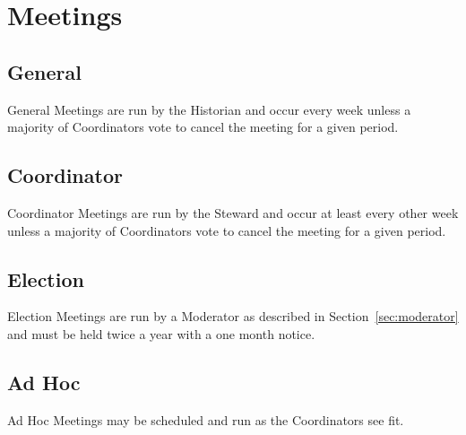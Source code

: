\chapter{Meetings}

\section{General}\label{sec:general_meetings}
General Meetings are run by the Historian and occur every week unless a majority of Coordinators vote to cancel the meeting for a given period.

\section{Coordinator}\label{sec:coordinator_meetings}
Coordinator Meetings are run by the Steward and occur at least every other week unless a majority of Coordinators vote to cancel the meeting for a given period.

\section{Election}\label{sec:election_meeting}
Election Meetings are run by a Moderator as described in Section~\ref{sec:moderator} and must be held twice a year with a one month notice.

\section{Ad Hoc}\label{sec:ad_hoc}
Ad Hoc Meetings may be scheduled and run as the Coordinators see fit.
